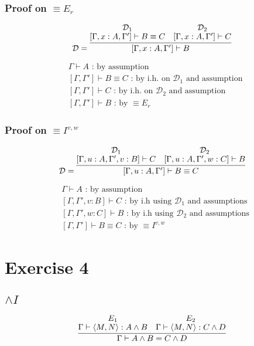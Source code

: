 \documentclass[11pt]{article}
\begin{document}
\subsubsection{Proof on $\equiv E_r$}

\[
\mathcal{D} =
\infer
  {[\Gamma, x:A, \Gamma'] \vdash B}
  {
    \deduce{[\Gamma, x:A, \Gamma'] \vdash B \equiv C}{\mathcal{D}_1} &
    \deduce{[\Gamma, x:A, \Gamma'] \vdash C}{\mathcal{D}_2}
  }
\]

\begin{align*}
  & \Gamma \vdash A \text{ : by assumption} \\
  & [\Gamma, \Gamma'] \vdash B \equiv C \text{ : by i.h. on $\mathcal{D}_1$ and assumption} \\
  & [\Gamma, \Gamma'] \vdash C \text{ : by i.h. on $\mathcal{D}_2$ and assumption} \\
  & [\Gamma, \Gamma'] \vdash B \text{ : by $\equiv E_r$}
\end{align*}

\subsubsection{Proof on $\equiv I^{v,w}$}

\[
\mathcal{D} =
\infer
  {[\Gamma, u:A, \Gamma'] \vdash B \equiv C}
  {
    \deduce{[\Gamma, u:A, \Gamma', v:B] \vdash C}{\mathcal{D}_1} &
    \deduce{[\Gamma, u:A, \Gamma', w:C] \vdash B}{\mathcal{D}_2}
  }
\]


\begin{align*}
  & \Gamma \vdash A \text{ : by assumption} \\
  & [\Gamma, \Gamma', v:B] \vdash C \text{ : by i.h using $\mathcal{D}_1$ and assumptions} \\
  & [\Gamma, \Gamma', w:C] \vdash B \text{ : by i.h using $\mathcal{D}_2$ and assumptions} \\
  & [\Gamma, \Gamma'] \vdash B \equiv C \text{ : by $\equiv I^{v,w}$}
\end{align*}



\section{Exercise 4}

\subsection{$\wedge I$}
\[
\infer
  {\Gamma \vdash A \wedge B = C \wedge D}
  {
    \deduce{\Gamma \vdash \langle M,N \rangle : A \wedge B}{E_1} &
    \deduce{\Gamma \vdash \langle M,N \rangle : C \wedge D}{E_2}
  }
\]
\end{document}
